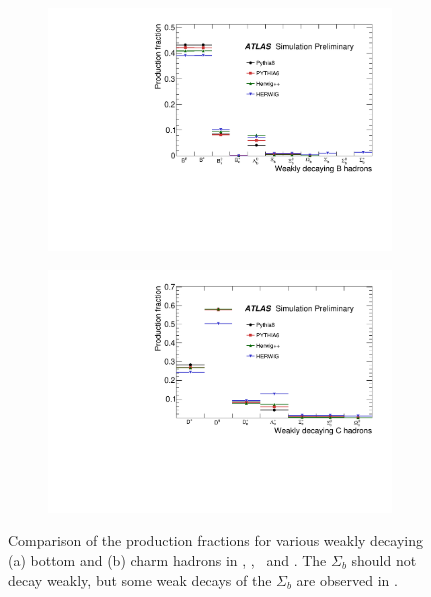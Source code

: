\begin{figure}
\centering
\begin{subfigure}[]{0.45\textwidth}
\includegraphics[width=\textwidth]{evtgen/figures/EvtGen/h_bgroundtype.pdf}
\end{subfigure}
\begin{subfigure}[]{0.45\textwidth}
\includegraphics[width=\textwidth]{evtgen/figures/EvtGen/h_cgroundtype.pdf}
\end{subfigure}
\caption{Comparison of the production fractions for various 
weakly decaying (a) bottom and (b) charm hadrons in 
\PythiaE, \Pythia, \Herwigpp\  and \Herwig.
The $\Sigma_{b}$ should not decay weakly, but some weak decays of the $\Sigma_{b}$ are observed in 
\Herwig. 
}
\label{fig:prodfrac}
\end{figure}


